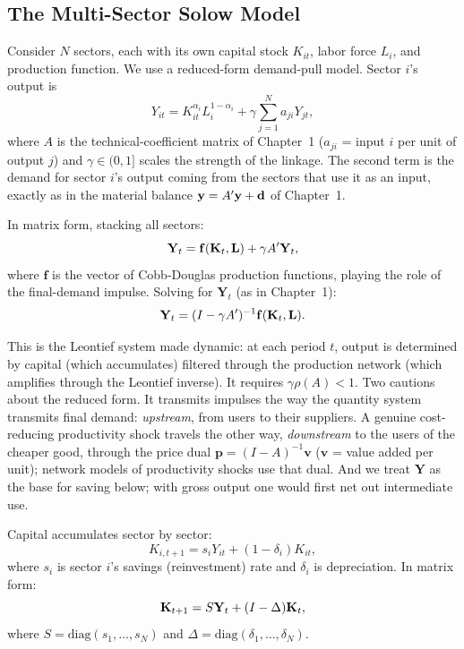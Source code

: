\documentclass[../structural_economics_book.tex]{subfiles}
\begin{document}
\subsection{The Multi-Sector Solow Model}

Consider $N$ sectors, each with its own capital stock $K_{it}$, labor force $L_i$, and production function. We use a reduced-form demand-pull model. Sector $i$'s output is
\begin{equation}\label{ch03:eq:sector_production}
Y_{it} = K_{it}^{\alpha_i} L_i^{1-\alpha_i} + \gamma \sum_{j=1}^N a_{ji} Y_{jt},
\end{equation}
where $A$ is the technical-coefficient matrix of Chapter~1 ($a_{ji}$ = input $i$ per unit of output $j$) and $\gamma \in (0, 1]$ scales the strength of the linkage. The second term is the demand for sector $i$'s output coming from the sectors that use it as an input, exactly as in the material balance $\mathbf{y} = A'\mathbf{y} + \mathbf{d}$ of Chapter~1.

In matrix form, stacking all sectors:
\begin{equation}\label{ch03:eq:output_system}
\mathbf{Y}_t = \mathbf{f}(\mathbf{K}_t, \mathbf{L}) + \gamma A' \mathbf{Y}_t,
\end{equation}
where $\mathbf{f}$ is the vector of Cobb-Douglas production functions, playing the role of the final-demand impulse. Solving for $\mathbf{Y}_t$ (as in Chapter~1):
\begin{equation}\label{ch03:eq:output_solution}
\mathbf{Y}_t = (I - \gamma A')^{-1}\mathbf{f}(\mathbf{K}_t, \mathbf{L}).
\end{equation}

This is the Leontief system made dynamic: at each period $t$, output is determined by capital (which accumulates) filtered through the production network (which amplifies through the Leontief inverse). It requires $\gamma\rho(A) < 1$. Two cautions about the reduced form. It transmits impulses the way the quantity system transmits final demand: \textit{upstream}, from users to their suppliers. A genuine cost-reducing productivity shock travels the other way, \textit{downstream} to the users of the cheaper good, through the price dual $\mathbf{p} = (I - A)^{-1}\mathbf{v}$ ($\mathbf{v}$ = value added per unit); network models of productivity shocks \citep{acemoglu2012network} use that dual. And we treat $\mathbf{Y}$ as the base for saving below; with gross output one would first net out intermediate use.

Capital accumulates sector by sector:
\begin{equation}\label{ch03:eq:capital_dynamics}
K_{i,t+1} = s_i Y_{it} + (1-\delta_i) K_{it},
\end{equation}
where $s_i$ is sector $i$'s savings (reinvestment) rate and $\delta_i$ is depreciation. In matrix form:
\begin{equation}\label{ch03:eq:capital_vector}
\mathbf{K}_{t+1} = S \mathbf{Y}_t + (I - \Delta)\mathbf{K}_t,
\end{equation}
where $S = \text{diag}(s_1, \ldots, s_N)$ and $\Delta = \text{diag}(\delta_1, \ldots, \delta_N)$.
\end{document}
